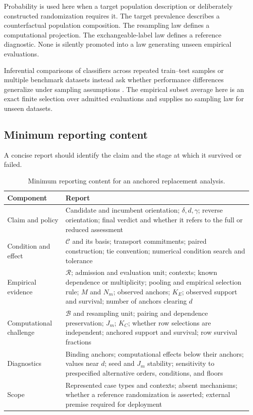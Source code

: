 \documentclass[11pt]{article}
\newcommand{\Regime}{\mathcal{R}}
\newcommand{\CSet}{\mathcal{C}}
\newcommand{\Boot}{\mathcal{B}}
\theoremstyle{remark}
\begin{document}
Probability is used here when a target population description or deliberately
constructed randomization requires it. The target prevalence describes a
counterfactual population composition. The resampling law defines a
computational projection. The exchangeable-label law defines a reference
diagnostic. None is silently promoted into a law generating unseen empirical
evaluations.

Inferential comparisons of classifiers across repeated train--test samples or
multiple benchmark datasets instead ask whether performance differences
generalize under sampling assumptions
\cite{nadeau2003inference,bouckaert2004estimating,demsar2006statistical}. The
empirical subset average here is an exact finite selection over admitted
evaluations and supplies no sampling law for unseen datasets.

\subsection{Minimum reporting content}

A concise report should identify the claim and the stage at which it survived
or failed.

\begin{table}[htbp]
\centering
\caption{Minimum reporting content for an anchored replacement analysis.}
\label{tab:reporting}
\begin{tabularx}{\textwidth}{@{}>{\raggedright\arraybackslash}p{}>{\raggedright\arraybackslash}X@{}}
\toprule
Component & Report \\
\midrule
Claim and policy & Candidate and incumbent orientation; $\delta,d,\gamma$; reverse orientation; final verdict and whether it refers to the full or reduced assessment \\
Condition and effect & $\CSet$ and its basis; transport commitments; paired construction; tie convention; numerical condition search and tolerance \\
Empirical evidence & $\Regime$; admission and evaluation unit; contexts; known dependence or multiplicity; pooling and empirical selection rule; $M$ and $N_m$; observed anchors; $K_E$; observed support and survival; number of anchors clearing $d$ \\
Computational challenge & $\Boot$ and resampling unit; pairing and dependence preservation; $J_m$; $K_C$; whether row selections are independent; anchored support and survival; row survival fractions \\
Diagnostics & Binding anchors; computational effects below their anchors; values near $d$; seed and $J_m$ stability; sensitivity to prespecified alternative orders, conditions, and floors \\
Scope & Represented case types and contexts; absent mechanisms; whether a reference randomization is asserted; external premise required for deployment \\
\bottomrule
\end{tabularx}
\end{table}
\end{document}
